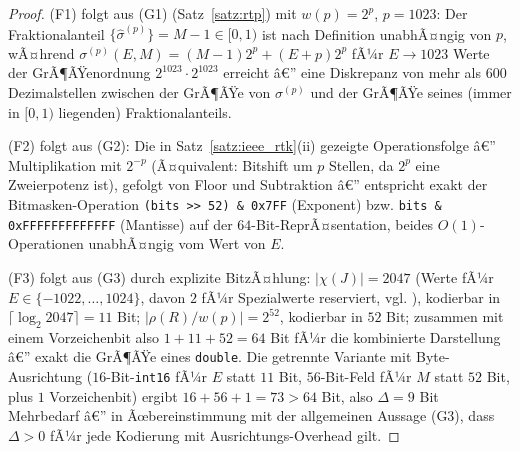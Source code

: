 ﻿\documentclass[a4paper,12pt]{article}
\theoremstyle{definition}
\begin{document}
\begin{proof}
	(F1) folgt aus (G1) (Satz~\ref{satz:rtp}) mit $w(p)=2^p$,
	$p=1023$: Der Fraktionalanteil $\{\hat\sigma^{(p)}\}=M-1\in[0,1)$ ist
	nach Definition unabhÃ¤ngig von $p$, wÃ¤hrend
	$\sigma^{(p)}(E,M)=(M-1)2^p+(E+p)2^p$ fÃ¼r $E\to1023$ Werte der
	GrÃ¶ÃŸenordnung $2^{1023}\cdot2^{1023}$ erreicht â€” eine Diskrepanz von
	mehr als $600$ Dezimalstellen zwischen der GrÃ¶ÃŸe von $\sigma^{(p)}$ und
	der GrÃ¶ÃŸe seines (immer in $[0,1)$ liegenden) Fraktionalanteils.

	(F2) folgt aus (G2): Die in Satz~\ref{satz:ieee_rtk}(ii) gezeigte
	Operationsfolge â€” Multiplikation mit $2^{-p}$ (Ã¤quivalent: Bitshift um
	$p$ Stellen, da $2^p$ eine Zweierpotenz ist), gefolgt von Floor und
	Subtraktion â€” entspricht exakt der Bitmasken-Operation
	\texttt{(bits >> 52) \& 0x7FF} (Exponent) bzw.
	\texttt{bits \& 0xFFFFFFFFFFFFF} (Mantisse) auf der $64$-Bit-ReprÃ¤sentation,
	beides $O(1)$-Operationen unabhÃ¤ngig vom Wert von $E$.

	(F3) folgt aus (G3) durch explizite BitzÃ¤hlung: $|\chi(J)|=2047$
	(Werte fÃ¼r $E\in\{-1022,\ldots,1024\}$, davon $2$ fÃ¼r Spezialwerte
	reserviert, vgl. \cite{ieee754}), kodierbar in $\lceil\log_2 2047\rceil=11$
	Bit; $|\rho(R)/w(p)|=2^{52}$, kodierbar in $52$ Bit; zusammen mit
	einem Vorzeichenbit also $1+11+52=64$ Bit fÃ¼r die kombinierte
	Darstellung â€” exakt die GrÃ¶ÃŸe eines \texttt{double}. Die getrennte
	Variante mit Byte-Ausrichtung ($16$-Bit-\texttt{int16} fÃ¼r $E$ statt
	$11$ Bit, $56$-Bit-Feld fÃ¼r $M$ statt $52$ Bit, plus $1$ Vorzeichenbit)
	ergibt $16+56+1=73>64$ Bit, also $\Delta=9$ Bit Mehrbedarf â€” in
	Ãœbereinstimmung mit der allgemeinen Aussage (G3), dass
	$\Delta>0$ fÃ¼r jede Kodierung mit Ausrichtungs-Overhead gilt. \qedhere
\end{proof}
\end{document}

